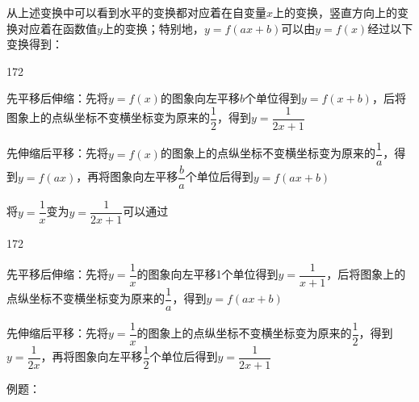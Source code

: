 从上述变换中可以看到水平的变换都对应着在自变量$x$上的变换，竖直方向上的变换对应着在函数值$y$上的变换；特别地，$y = f(ax+b)$可以由$y = f(x)$经过以下变换得到：
\begin{dingautolist}{172}
    \item 先平移后伸缩：先将$y = f(x)$的图象向左平移$b$个单位得到$y = f(x+b)$，后将图象上的点纵坐标不变横坐标变为原来的$\dfrac{1}{2}$，得到$y = \dfrac{1}{2x+1}$
    \item 先伸缩后平移：先将$y = f(x)$的图象上的点纵坐标不变横坐标变为原来的$\dfrac{1}{a}$，得到$y = f(ax)$，再将图象向左平移$\dfrac{b}{a}$个单位后得到$y = f(ax+b)$
\end{dingautolist}
\begin{example}
    将$y = \dfrac{1}{x}$变为$y = \dfrac{1}{2x+1}$可以通过\begin{dingautolist}{172}
    \item 先平移后伸缩：先将$y = \dfrac{1}{x}$的图象向左平移1个单位得到$y = \dfrac{1}{x+1}$，后将图象上的点纵坐标不变横坐标变为原来的$\dfrac{1}{a}$，得到$y = f(ax+b)$
    \item 先伸缩后平移：先将$y = \dfrac{1}{x}$的图象上的点纵坐标不变横坐标变为原来的$\dfrac{1}{2}$，得到$y = \dfrac{1}{2x}$，再将图象向左平移$\dfrac{1}{2}$个单位后得到$y = \dfrac{1}{2x+1}$
\end{dingautolist}
\end{example}
例题：
